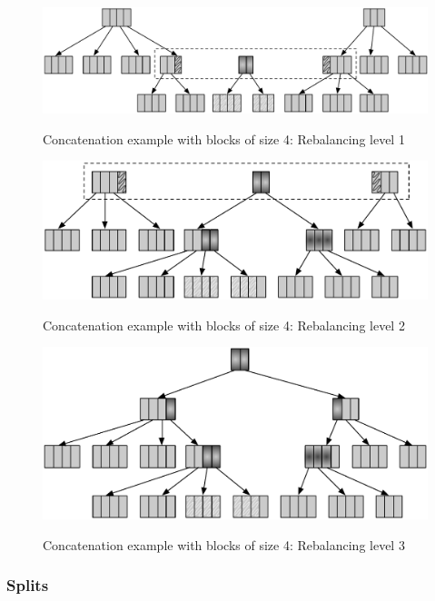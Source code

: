 \begin{figure}[h!]
  \centering
  \includegraphics[width=\textwidth]{Figures/Concat1.pdf}
  \label{Concat1Benchmarks}
  \caption{Concatenation example with blocks of size 4: Rebalancing level 1}
\end{figure}

\begin{figure}[h!]
  \centering
  \includegraphics[width=\textwidth]{Figures/Concat2.pdf}
  \label{Concat2Benchmarks}
  \caption{Concatenation example with blocks of size 4: Rebalancing level 2}
\end{figure}

\begin{figure}[h!]
  \centering
  \includegraphics[width=\textwidth]{Figures/Concat3.pdf}
  \label{Concat3Benchmarks}
  \caption{Concatenation example with blocks of size 4: Rebalancing level 3}
\end{figure}


\subsubsection{Splits}



